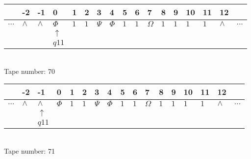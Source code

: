 \documentclass{article}
\begin{document}
\begin{table}[H]
\centering
\begin{tabular}{lllllllllllllllll}
 & -2 & -1 & 0 & 1 & 2 & 3 & 4 & 5 & 6 & 7 & 8 & 9 & 10 & 11 & 12 & \\
\hline
$...$ & \multicolumn{1}{|l|}{$\wedge$} & \multicolumn{1}{|l|}{$\wedge$} & \multicolumn{1}{|l|}{$\Phi$} & \multicolumn{1}{|l|}{$1$} & \multicolumn{1}{|l|}{$1$} & \multicolumn{1}{|l|}{$\Psi$} & \multicolumn{1}{|l|}{$\Phi$} & \multicolumn{1}{|l|}{$1$} & \multicolumn{1}{|l|}{$1$} & \multicolumn{1}{|l|}{$\Omega$} & \multicolumn{1}{|l|}{$1$} & \multicolumn{1}{|l|}{$1$} & \multicolumn{1}{|l|}{$1$} & \multicolumn{1}{|l|}{$1$} & \multicolumn{1}{|l|}{$\wedge$} & $...$\\
\hline
&  &  & $\uparrow$ &  &  &  &  &  &  &  &  &  &  &  &  &  \\
&  &  & $ q11 $ &  &  &  &  &  &  &  &  &  &  &  &  &  \\
\end{tabular}
\\
Tape number: 70
\noindent\makebox[\linewidth]{\hdashrule{\textwidth}{1pt}{1pt}}\end{table}

\begin{table}[H]
\centering
\begin{tabular}{lllllllllllllllll}
 & -2 & -1 & 0 & 1 & 2 & 3 & 4 & 5 & 6 & 7 & 8 & 9 & 10 & 11 & 12 & \\
\hline
$...$ & \multicolumn{1}{|l|}{$\wedge$} & \multicolumn{1}{|l|}{$\wedge$} & \multicolumn{1}{|l|}{$\Phi$} & \multicolumn{1}{|l|}{$1$} & \multicolumn{1}{|l|}{$1$} & \multicolumn{1}{|l|}{$\Psi$} & \multicolumn{1}{|l|}{$\Phi$} & \multicolumn{1}{|l|}{$1$} & \multicolumn{1}{|l|}{$1$} & \multicolumn{1}{|l|}{$\Omega$} & \multicolumn{1}{|l|}{$1$} & \multicolumn{1}{|l|}{$1$} & \multicolumn{1}{|l|}{$1$} & \multicolumn{1}{|l|}{$1$} & \multicolumn{1}{|l|}{$\wedge$} & $...$\\
\hline
&  & $\uparrow$ &  &  &  &  &  &  &  &  &  &  &  &  &  &  \\
&  & $ q11 $ &  &  &  &  &  &  &  &  &  &  &  &  &  &  \\
\end{tabular}
\\
Tape number: 71
\noindent\makebox[\linewidth]{\hdashrule{\textwidth}{1pt}{1pt}}\end{table}
\clearpage
\end{document}
